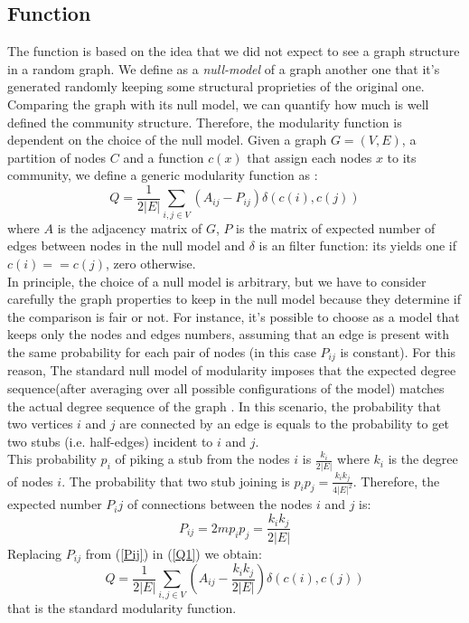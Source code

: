 \subsection{Function}
The function is based on the idea that we did not expect to see a graph structure in a random graph.
We define as a \textit{null-model} of a graph another one that it's generated randomly keeping some structural proprieties of the original one.
Comparing the graph with its null model, we can quantify how much is well defined the community structure. Therefore, the modularity function is dependent on the choice of the null model. 
Given a graph $G = (V,E)$, a partition of nodes $C$ and a function $c(x)$ that assign each nodes $x$ to its community, we define a generic modularity function as :
\begin{equation}\label{Q1}
Q = \frac{1}{2|E|} \sum_{i,j \in V}(A_{ij} - P_{ij}) \delta(c(i), c(j))
\end{equation}
where $A$ is the  adjacency matrix of $G$, $P$ is the matrix of expected number of edges between nodes in the null model and $\delta$ is an filter function: its yields one if $c(i) == c(j)$, zero otherwise.\\
In principle, the choice of a null model is arbitrary, but we have to consider carefully the graph properties to keep in the null model because they determine if the comparison is fair or not. 
For instance, it's possible to choose as a model that keeps only the nodes and edges numbers, assuming that an edge is present with the same probability for each pair of nodes (in this case $P_{ij}$ is constant). 
For this reason, The standard null model of modularity imposes that the expected degree sequence(after averaging over all possible configurations of the model) matches the actual degree sequence of the graph \cite{fortunato}.
In this scenario, the probability that two vertices $i$ and $j$ are connected by an edge is equals to the probability to get two stubs (i.e. half-edges) incident to $i$ and $j$.\\
This probability $p_i$ of piking a stub from the nodes $i$ is $\frac{k_i}{2|E|}$ where $k_i$ is the degree of nodes $i$. The probability that two stub joining is $p_ip_j = \frac{k_ik_j}{4|E|^2}$. Therefore, the expected number $P_ij$ of connections between the nodes $i$ and $j$ is:
\begin{equation}\label{Pij}
P_{ij} = 2mp_ip_j = \frac{k_ik_j}{2|E|}
\end{equation}
Replacing $P_{ij}$ from (\ref{Pij}) in (\ref{Q1}) we obtain:
\begin{equation}\label{ModularityQ}
Q = \frac{1}{2|E|} \sum_{i,j \in V}(A_{ij} - \frac{k_ik_j}{2|E|}) \delta(c(i), c(j))
\end{equation}
that is the standard modularity function.

